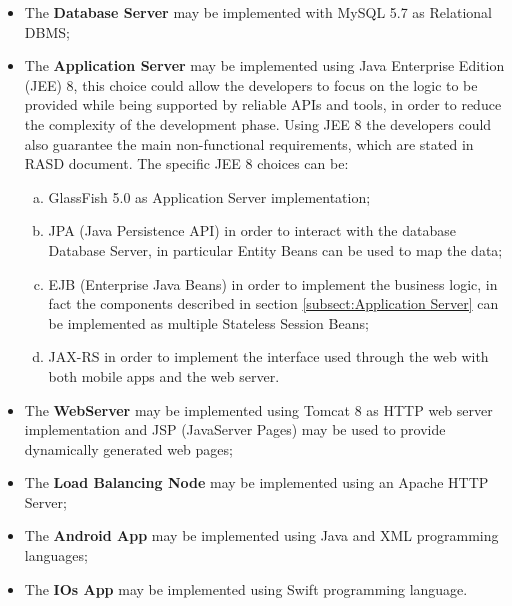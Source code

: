 \begin{itemize}
	\item The \textbf{Database Server} may be implemented with MySQL 5.7 as Relational DBMS;
	
	\item The \textbf{Application Server} may be implemented using Java Enterprise Edition (JEE) 8, this choice could allow the developers to focus on the logic to be provided while being supported by reliable APIs and tools, in order to reduce the complexity of the development phase. Using JEE 8 the developers could also guarantee the main non-functional requirements, which are stated in RASD document. The specific JEE 8 choices can be:
	\begin{enumerate}[a)]
		\item GlassFish 5.0 as Application Server implementation;
		\item JPA (Java Persistence API) in order to interact with the database Database Server, in particular Entity Beans can be used to map the data;
		\item EJB (Enterprise Java Beans) in order to implement the business logic, in fact the components described in section \ref{subsect:Application Server} can be implemented as multiple Stateless Session Beans;
		\item JAX-RS in order to implement the interface used through the web with both mobile apps and the web server.
	\end{enumerate}
	
	\item The \textbf{WebServer} may be implemented using Tomcat 8 as HTTP web server implementation and JSP (JavaServer Pages) may be used to provide dynamically generated web pages;
	
	\item The \textbf{Load Balancing Node} may be implemented using an Apache HTTP Server;
	
	\item The \textbf{Android App} may be implemented using Java and XML programming languages;
	
	\item The \textbf{IOs App} may be implemented using Swift programming language.
\end{itemize}
\newpage